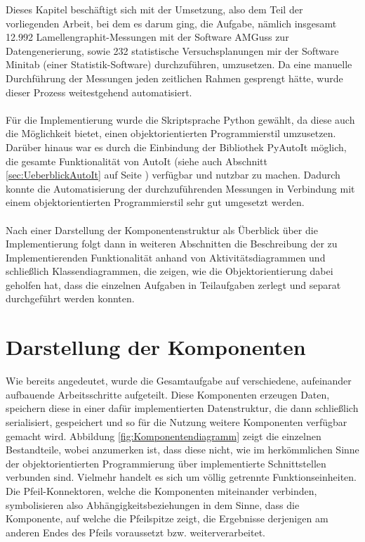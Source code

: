 \documentclass[
fontsize=10pt, 
listof = totoc,
parskip = half	
]{report}
\begin{document}
Dieses Kapitel beschäftigt sich mit der Umsetzung, also dem Teil der vorliegenden Arbeit, bei dem es darum ging, die Aufgabe, nämlich insgesamt 12.992 Lamellengraphit-Messungen mit der Software AMGuss zur Datengenerierung, sowie 232 statistische Versuchsplanungen mir der Software Minitab (einer Statistik-Software) durchzuführen, umzusetzen. Da eine manuelle Durchführung der Messungen jeden zeitlichen Rahmen gesprengt hätte, wurde dieser Prozess weitestgehend automatisiert.
\\\\
\noindent Für die Implementierung wurde die Skriptsprache Python gewählt, da diese auch die Möglichkeit bietet, einen objektorientierten Programmierstil umzusetzen. Darüber hinaus war es durch die Einbindung der Bibliothek PyAutoIt möglich, die gesamte Funktionalität von AutoIt (siehe auch Abschnitt \ref{sec:UeberblickAutoIt} auf Seite \pageref{sec:UeberblickAutoIt}) verfügbar und nutzbar zu machen. Dadurch konnte die Automatisierung der durchzuführenden Messungen in Verbindung mit einem objektorientierten Programmierstil sehr gut umgesetzt werden.
\\\\
\noindent Nach einer Darstellung der Komponentenstruktur als Überblick über die Implementierung folgt dann in weiteren Abschnitten die Beschreibung der zu Implementierenden Funktionalität anhand von Aktivitätsdiagrammen und schließlich Klassendiagrammen, die zeigen, wie die Objektorientierung dabei geholfen hat, dass die einzelnen Aufgaben in Teilaufgaben zerlegt und separat durchgeführt werden konnten.

\section{Darstellung der Komponenten}
\label{sec:Komponentendarstellung}

Wie bereits angedeutet, wurde die Gesamtaufgabe auf verschiedene, aufeinander aufbauende Arbeitsschritte aufgeteilt. Diese Komponenten erzeugen Daten, speichern diese in einer dafür implementierten Datenstruktur, die dann schließlich serialisiert, gespeichert und so für die Nutzung weitere Komponenten verfügbar gemacht wird. Abbildung \ref{fig:Komponentendiagramm} zeigt die einzelnen Bestandteile, wobei anzumerken ist, dass diese nicht, wie im herkömmlichen Sinne der objektorientierten Programmierung über implementierte Schnittstellen verbunden sind. Vielmehr handelt es sich um völlig getrennte Funktionseinheiten. Die Pfeil-Konnektoren, welche die Komponenten miteinander verbinden, symbolisieren also Abhängigkeitsbeziehungen in dem Sinne, dass die Komponente, auf welche die Pfeilspitze zeigt, die Ergebnisse derjenigen am anderen Endes des Pfeils voraussetzt bzw. weiterverarbeitet.
\end{document}
